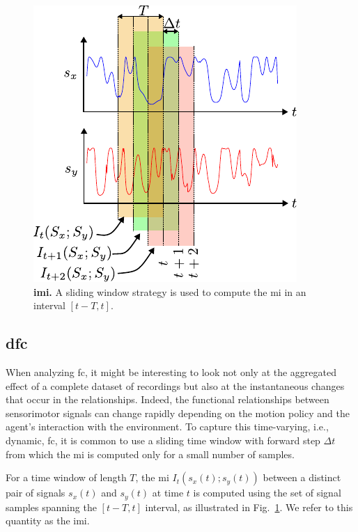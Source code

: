 \begin{figure}[!t]
	\begin{center}
		\hspace*{\fill}
		\includegraphics[width=0.7\columnwidth]{sliding_window_mi.pdf}
		\hspace*{\fill}
	\end{center}
	\caption{\label{fig:mi_sliding_window_mi} \textbf{\Acl{imi}.} A sliding window strategy is used to compute the \ac{mi} in an interval $\left[t-T,t\right]$.}
\end{figure}
\subsection{\Acl{dfc}}
When analyzing \ac{fc}, it might be interesting to look not only at the aggregated effect of a complete dataset of recordings but also at the instantaneous changes that occur in the relationships. Indeed, the functional relationships between sensorimotor signals can change rapidly depending on the motion policy and the agent's interaction with the environment. To capture this time-varying, i.e., dynamic, \acl{fc}, it is common to use a sliding time window \cite{Preti2017dynamicfunctionalconnectome} with forward step $\Delta t$ from which the \ac{mi} is computed only for a small number of samples.

For a time window of length $T$, the \ac{mi} $I_t(s_x(t);s_y(t))$ between a distinct pair of signals $s_x(t)$ and $s_y(t)$ at time $t$ is computed using the set of signal samples spanning the $\left[t-T,t\right]$ interval, as illustrated in Fig.~\ref{fig:mi_sliding_window_mi}. We refer to this quantity as the \acf{imi}. 

